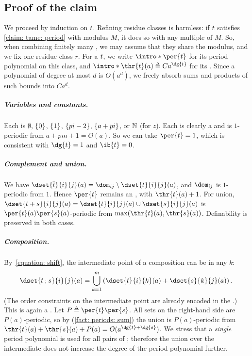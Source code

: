 \subsection{Proof of the claim}\label{section: upper bound proof}
We proceed by induction on $\term$.
Refining residue classes is harmless: if $\term$ satisfies \cref{claim: tame: period} with modulus $M$, it does so with any multiple of $M$.
So, when combining finitely many , we may assume that they share the modulus, and we fix one residue class $r$.
\AP For a  $\term[1]$, we write $\intro*\per{\term[1]}$ for its period polynomial on this class, and $\intro*\thr{\term[1]}(a) \defeq C a^{\dg{\term[1]}}$ for its .
Since a polynomial of degree at most $d$ is $O(a^{d})$, we freely absorb sums and products of such bounds into $C a^{d}$.

\subparagraph*{Variables and constants.}
Each  is $\emptyset$, $\{0\}$, $\{1\}$, $\{p i - 2\}$, $\{a + p i\}$, or $\mathbb{N}$ (for $z$).
Each is clearly a  and is $1$-periodic from $a + p m + 1 = O(a)$.
So we can take $\per{\term} = 1$, which is consistent with $\dg{\term} = 1$ and $\ib{\term} = 0$.

\subparagraph*{Complement and union.}
We have $\dset{\com{\term[1]}}{i}{j}(a) = \dom_{ij} \setminus \dset{\term[1]}{i}{j}(a)$, and $\dom_{ij}$ is $1$-periodic from $1$.
Hence $\per{\term[1]}$ remains an , with  $\thr{\term[1]}(a) + 1$.
For union, $\dset{\term[1] \union \term[2]}{i}{j}(a) = \dset{\term[1]}{i}{j}(a) \cup \dset{\term[2]}{i}{j}(a)$ is $\per{\term[1]}(a)\per{\term[2]}(a)$-periodic from $\max(\thr{\term[1]}(a), \thr{\term[2]}(a))$.
Definability is preserved in both cases.

\subparagraph*{Composition.}
By~\eqref{equation: shift}, the intermediate point of a composition can be in any  $k$:
\[\dset{\term[1] \compo \term[2]}{i}{j}(a) = \bigcup_{k = 1}^{m} \left(\dset{\term[1]}{i}{k}(a) + \dset{\term[2]}{k}{j}(a)\right).\]
(The order constraints on the intermediate point are already encoded in the .)
This is again a .
Let $P \defeq \per{\term[1]} \per{\term[2]}$.
All sets on the right-hand side are $P(a)$-periodic, so by (\ref{fact: periods: sum}) the union is $P(a)$-periodic from $\thr{\term[1]}(a) + \thr{\term[2]}(a) + P(a) = O(a^{\dg{\term[1]} + \dg{\term[2]}})$.
We stress that a \emph{single} period polynomial is used for all pairs of ; therefore the union over the intermediate  does not increase the degree of the period polynomial further.

